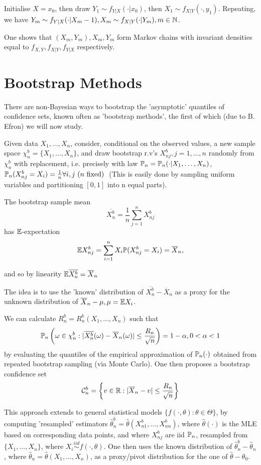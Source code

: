 \documentclass[a4paper]{article}
\begin{document}
Initialise $X= x_0$, then draw $Y_1 \sim f_{Y|X}(\cdot |x_0)$, then $X_1 \sim f_{X|Y}(\cdot , y_1)$. Repeating, we have $Y_m \sim f_{Y|X}(\cdot |X_m-1), X_m \sim f_{X|Y}(\cdot |Y_m), m \in \N$.

One shows that $(X_m, Y_m), X_m, Y_m$ form Markov chains with invariant densities equal to $f_{X,Y}, f_{X|Y}, f_{Y|X}$ respectively.

\section{Bootstrap Methods}

There are non-Bayesian ways to bootstrap the 'asymptotic' quantiles of confidence sets, known often as 'bootstrap methods', the first of which (due to B. Efron) we will now study.

Given data $X_1, \ldots, X_n$, consider, conditional on the observed values, a new sample space $\chi_n^{b} = \{X_1, \ldots, X_n\} $, and draw bootstrap r.v's $X_{nj}^{b}, j=1,\ldots,n$ randomly from $\chi_n^{b}$ with replacement, i.e. precisely with law $\P_n = \P_n(\cdot |X_1,\ldots,X_n)$, $\P_n (X_{nj}^{b} = X_i) = \frac{1}{n} \forall i,j \text{ ($n$ fixed) }$ (This is easily done by sampling uniform variables and partitioning  $[0,1]$ into n equal parts).

The bootstrap sample mean 
\[
\overline{X_n^{b}} = \frac{1}{n} \sum_{j=1}^{n} X_{nj}^{b} 
\] has $\E$-expectation
\[
	\E X_{nj}^{b} = \sum_{i=1}^{n} X_i \P(X_{nj}^{b} = X_i) = \overline{X}_n
,\] 

and so by linearity $\E \overline{X_n^{b}} = \overline{X}_n$

The idea is to use the 'known' distribution of $\overline{X_{n}^{b}} - \overline{X}_n$ as a proxy for the unknown distribution of $\overline{X}_n - \mu, \mu = \E X_i$.

We can calculate  $R_n^{b} = R_n^{b}(X_1,\ldots,X_n)$ such that
\[
	\P_n\left(\omega \in \chi_n^{b} : | \overline{X_n^{b}}(\omega) - \overline{X}_n(\omega)| \le \frac{R_n}{\sqrt{n} }\right) = 1- \alpha, 0 < \alpha < 1
\] by evaluating the quantiles of the empirical approximation  of $\P_n(\cdot )$ obtained from repeated bootstrap sampling (via Monte Carlo). One then proposes a bootstrap confidence set
\[
\mathcal{C}_n^{b} = \left\{v \in \R : |\overline{X}_n - v| \le  \frac{R_n}{\sqrt{n} }\right\} 
\] 

This approach extends to general statistical models $\{f\left( \cdot , \theta \right) : \theta \in \Theta \}$, by computing 'resampled' estimators $\hat{\theta}_n^{b} = \hat{\theta} (X_{n1}^{b}, \ldots, X_{nn}^{b})$, where  $\hat{\theta}(\cdot )$ is the MLE based on corresponding data points, and where $X_{nj}^{b}$ are iid $\P_n$, resampled from $\{X_1,\ldots,X_n\} $, where $X_i \stackrel{iid}{\sim} f(\cdot , \theta)$. One then uses the known distribution of $\hat{\theta}_n^{b} - \hat{\theta}_n$, where $\hat{\theta}_n = \hat{\theta}(X_1,\ldots,X_n)$, as a proxy/pivot distribution for the one of $\hat{\theta} - \theta_0$.
\end{document}
